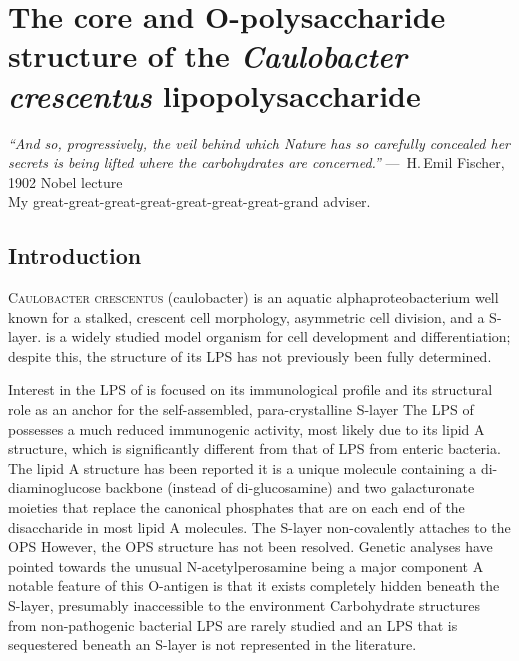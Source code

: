 \acresetall

\chapter{The core and O-polysaccharide structure of the \textit{Caulobacter crescentus} lipopolysaccharide}
\label{ch:lps}
\begin{epigraph}
  \emph{``And so, progressively, the veil behind which Nature has so carefully concealed her secrets
    is being lifted where the carbohydrates are concerned.''} ---~H.\,Emil Fischer, 1902 Nobel
  lecture\\ My great-great-great-great-great-great-great-grand adviser.
\end{epigraph}
\section{Introduction} %
\label{sec:lps_introduction} 
\lettrine[lines=2]{C}{aulobacter crescentus} (\acs{caulobacter}) is an aquatic alphaproteobacterium
well known for a stalked, crescent cell morphology, asymmetric cell division, and a
\ac{S-layer}. \caulobacter is a widely studied model organism for cell development and
differentiation; despite this, the structure of its \ac{LPS} has not previously been fully
determined.

Interest in the \ac{LPS} of \caulobacter is focused on its immunological
profile and its structural role as an anchor for the
self-assembled, para-crystalline \ac{S-layer} The \ac{LPS}
of \caulobacter possesses a much reduced immunogenic activity, most likely due
to its lipid A structure, which is significantly different from that of
\ac{LPS} from enteric bacteria. The lipid A structure has been
reported it is a unique molecule containing a
di-diaminoglucose backbone (instead of di-glucosamine) and two galacturonate
moieties that replace the canonical phosphates that are on each end of the
disaccharide in most lipid A molecules. The \caulobacter \ac{S-layer}
non-covalently attaches to the \ac{OPS} However, the
\ac{OPS} structure has not been resolved. Genetic analyses have pointed
towards the unusual N-acetylperosamine being a major
component A notable feature of this O-antigen is that it
exists completely hidden beneath the S-layer, presumably inaccessible to the
environment Carbohydrate structures from non-pathogenic
bacterial \ac{LPS} are rarely studied and an \ac{LPS} that is sequestered
beneath an \ac{S-layer} is not represented in the literature.
 
